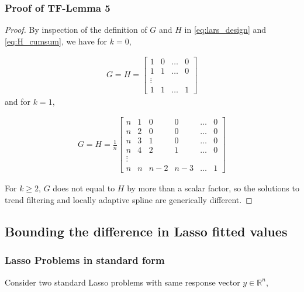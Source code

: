 \documentclass[a4paper]{article}
\newcommand{\RR}{\mathbb{R}}
\begin{document}
\subsubsection{Proof of TF-Lemma 5}
\begin{proof}
By inspection of the definition of $G$ and $H$ in \eqref{eq:lars_design} and \eqref{eq:H_cumsum}, we have for $k = 0$,

\begin{align*}
G = H = 
\begin{bmatrix}
1 & 0 & \ldots & 0\\
1 & 1 & \ldots & 0\\
\vdots\\
1 & 1 & \ldots & 1
\end{bmatrix}
\end{align*}
and for $k = 1$,

\begin{align*}
G = H = \frac{1}{n}
\begin{bmatrix}
n & 1 & 0 & 0 & \ldots & 0\\
n & 2 & 0 & 0 & \ldots & 0\\
n & 3 & 1 & 0 & \ldots & 0\\
n & 4 & 2 & 1 & \ldots & 0\\
\vdots\\
n & n & n-2 & n-3 & \ldots & 1
\end{bmatrix}
\end{align*}

For $k\geq 2$, $G$ does not equal to $H$ by more than a scalar factor, so the solutions to trend filtering and locally adaptive spline are generically different.
\end{proof}

\subsection{Bounding the difference in Lasso fitted values}
\subsubsection{Lasso Problems in standard form}

Consider two standard Lasso problems with same response vector $y\in\RR^n$,
\end{document}
